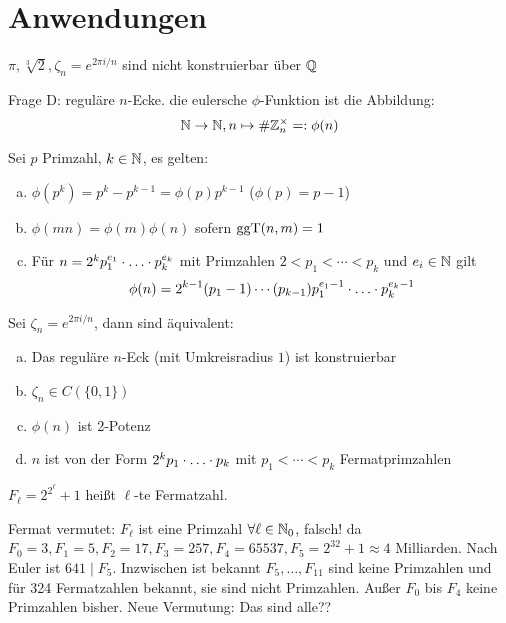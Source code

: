 \documentclass[a4paper]{report}
\begin{document}
\section{Anwendungen}
\begin{satz}
$\pi, \sqrt[3] 2, \zeta_{n} = e^{2\pi i/n}$ sind nicht konstruierbar über $\mathbb{Q}$
\end{satz}
\begin{bem*}
Frage D: reguläre $n$-Ecke. die eulersche $\phi$-Funktion ist die Abbildung:  \[\mathbb{N} \to \mathbb{N}, n \mapsto \#\mathbb{Z}_{n}^\times =: \phi(n)\]
\end{bem*}
\begin{lemm}
  Sei $p$ Primzahl, $k \in \mathbb{N}$, es gelten:
  \begin{enumerate}[(a)]
    \item $\phi(p^{k}) = p^{k} - p^{k-1} = \phi(p) p^{k-1}$ ($\phi(p) = p-1$)
    \item $\phi(mn) = \phi(m)\phi(n)$ sofern $\operatorname{ggT}(n,m) = 1$
          \item Für $n = 2^{k} p_{1}^{e_{1}} \cdot \ldots \cdot p_{k}^{e_{k}}$ mit Primzahlen $2 < p_{1} < \cdots < p_{k}$ und $e_{i} \in \mathbb{N}$ gilt \[\phi(n) = 2^{k-1}(p_{1} - 1)\cdots (p_{k-1})p_{1}^{e_{1}-1} \cdot \ldots \cdot p_{k}^{e_{k}-1}\]
  \end{enumerate}
\end{lemm}

\begin{satz}[Gauß]
  Sei $\zeta_{n} = e^{2\pi i / n}$, dann sind äquivalent:
  \begin{enumerate}[(a)]
    \item Das reguläre $n$-Eck (mit Umkreisradius $1$) ist konstruierbar
    \item $\zeta_{n} \in C(\{0,1\})$
    \item $\phi(n)$ ist 2-Potenz
          \item $n$ ist von der Form $2^{k}p_{1} \cdot \ldots \cdot p_{k}$ mit $p_{1} < \cdots <p_{k}$ Fermatprimzahlen
  \end{enumerate}
\end{satz}

\begin{defi}
  $F_{\ell} = 2^{2^{\ell}} + 1$ heißt $\ell$-te Fermatzahl.
\end{defi}
Fermat vermutet: $F_{\ell}$ ist eine Primzahl $\forall \ell \in \mathbb{N}_0$, falsch! da
$F_{0} = 3, F_{1} = 5, F_{2} = 17, F_{3} = 257, F_{4} = 65537, F_{5} = 2^{32}+1 \approx 4$ Milliarden. Nach Euler ist $641 \mid F_{5}$.
Inzwischen ist bekannt $F_{5}, \ldots, F_{11}$ sind keine Primzahlen und für 324 Fermatzahlen bekannt, sie sind nicht Primzahlen. Außer $F_{0}$ bis $F_{4}$ keine Primzahlen bisher. Neue Vermutung: Das sind alle??
\end{document}
